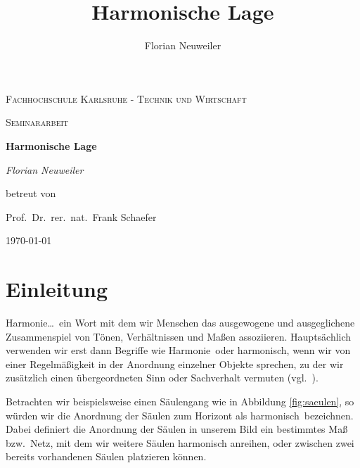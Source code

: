 \documentclass[12pt,a4paper]{article}
\author{Florian Neuweiler}
\date{}
\title{Harmonische Lage}
\begin{document}

\setlength{\columnsep}{1.5cm}
\setlength{\columnseprule}{1pt}

\theoremstyle{definition}

\begin{titlepage}
\centering
{\scshape\LARGE Fachhochschule Karlsruhe - Technik und Wirtschaft \par}
\vspace{1cm}
{\scshape\Large Seminararbeit\par}
\vspace{1.5cm}
{\huge\bfseries Harmonische Lage\par}
\vspace{1.5cm}
{\Large\itshape Florian Neuweiler\par}
\vspace{1.5cm}
betreut von\par
Prof.~Dr.~rer.~nat.~Frank Schaefer
\vspace{2cm}

\vfill
{\large \today\par}
\end{titlepage}

\newpage
\tableofcontents

\newpage

\setlength{\parindent}{0pt}

\section{Einleitung}
Harmonie\dots ~ein Wort mit dem wir Menschen das ausgewogene und ausgeglichene Zusammenspiel von Tönen, Verhältnissen und Maßen assoziieren. Hauptsächlich verwenden wir erst dann Begriffe wie \glqq Harmonie\grqq ~oder \glqq harmonisch\grqq , wenn wir von einer Regelmäßigkeit in der Anordnung einzelner Objekte sprechen, zu der wir zusätzlich einen übergeordneten Sinn oder Sachverhalt vermuten (vgl.~\citep{harmDef}).%

Betrachten wir beispielsweise einen Säulengang wie in Abbildung \ref{fig:saeulen}, so würden wir die Anordnung der Säulen zum Horizont als \glqq harmonisch\grqq ~bezeichnen. Dabei definiert die Anordnung der Säulen in unserem Bild ein bestimmtes Maß bzw.~Netz, mit dem wir weitere Säulen harmonisch anreihen, oder zwischen zwei bereits vorhandenen Säulen platzieren können.
\end{document}
